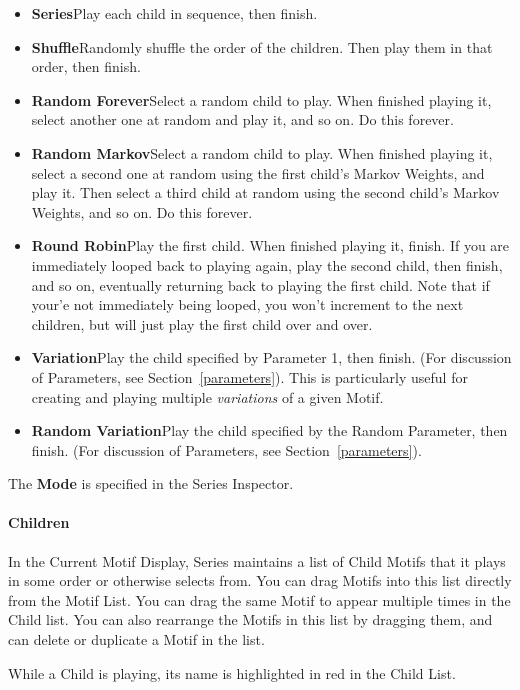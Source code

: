 \documentclass[twoside,10pt]{article}
\begin{document}
\begin{itemize}
\item{\bf Series}\quad Play each child in sequence, then finish.
\item{\bf Shuffle}\quad Randomly shuffle the order of the children.  Then play them in that order, then finish.
\item{\bf Random Forever}\quad Select a random child to play.  When finished playing it, select another one at random and play it, and so on.  Do this forever.  
\item{\bf Random Markov}\quad Select a random child to play.  When finished playing it, select a second one at random using the first child's Markov Weights, and play it.  Then select a third child at random using the second child's Markov Weights, and so on.  Do this forever.
\item{\bf Round Robin}\quad Play the first child.  When finished playing it, finish.  If you are immediately looped back to playing again, play the second child, then finish, and so on, eventually returning back to playing the first child.  Note that if your'e not immediately being looped, you won't increment to the next children, but will just play the first child over and over.
\item{\bf Variation}\quad Play the child specified by Parameter 1, then finish. (For discussion of Parameters, see Section~\ref{parameters}).  This is particularly useful for creating and playing multiple {\it variations} of a given Motif.
\item{\bf Random Variation}\quad Play the child specified by the Random Parameter, then finish. (For discussion of Parameters, see Section~\ref{parameters}).
\end{itemize}

The {\bf Mode} is specified in the Series Inspector.

\paragraph{Children}

In the Current Motif Display, Series maintains a list of Child Motifs that it plays in some order or otherwise selects from.  You can drag Motifs into this list directly from the Motif List.  You can drag the same Motif to appear multiple times in the Child list.  You can also rearrange the Motifs in this list by dragging them, and can delete or duplicate a Motif in the list.

While a Child is playing, its name is highlighted in red in the Child List.
\end{document}
